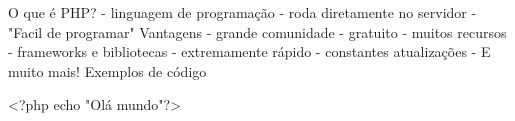 O que é PHP?
    - linguagem de programação
    - roda diretamente no servidor
    - "Facil de programar"
Vantagens
    - grande comunidade
    - gratuito
    - muitos recursos
    - frameworks e bibliotecas
    - extremamente rápido
    - constantes atualizações
    - E muito mais!
Exemplos de código

    <?php echo "Olá mundo"?>
